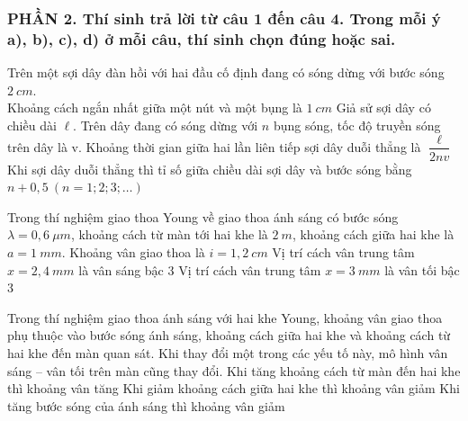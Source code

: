 \subsubsection*{PHẦN 2. Thí sinh trả lời từ câu 1 đến câu 4. Trong mỗi ý a), b), c), d) ở mỗi câu, thí sinh chọn đúng hoặc sai.}
\setcounter{ex}{0}
\begin{ex}
	Trên một sợi dây đàn hồi với hai đầu cố định đang có sóng dừng với bước sóng $2 ~cm$.\\
	{Khoảng cách ngắn nhất giữa một nút và một bụng là $1 ~cm$}
	{Giả sử sợi dây có chiều dài $\ell$. Trên dây đang có sóng dừng với $n$ bụng sóng, tốc độ truyền sóng trên dây là v. Khoảng thời gian giữa hai lần liên tiếp sợi dây duỗi thẳng là $\dfrac{\ell}{2 nv}$}
	{Khi sợi dây duỗi thẳng thì tỉ số giữa chiều dài sợi dây và bước sóng bằng $n+0,5\ (n=1; 2; 3; \ldots)$}
	
\end{ex}

\begin{ex}
	Trong thí nghiệm giao thoa Young về giao thoa ánh sáng có bước sóng $\lambda=0,6~\mu m$, khoảng cách từ màn tới hai khe là $2 ~m$, khoảng cách giữa hai khe là $a=1 ~mm$.
		{Khoảng vân giao thoa là $i=1,2~cm$}
		{Vị trí cách vân trung tâm $x=2,4~mm$ là vân sáng bậc 3}
		{\True Vị trí cách vân trung tâm $x=3~mm$ là vân tối bậc 3}
\end{ex}
\begin{ex}
Trong thí nghiệm giao thoa ánh sáng với hai khe Young, khoảng vân giao thoa phụ thuộc vào bước sóng ánh sáng, khoảng cách giữa hai khe và khoảng cách từ hai khe đến màn quan sát. Khi thay đổi một trong các yếu tố này, mô hình vân sáng – vân tối trên màn cũng thay đổi. 
	{\True Khi tăng khoảng cách từ màn đến hai khe thì khoảng vân tăng}
	{Khi giảm khoảng cách giữa hai khe thì khoảng vân giảm}
	{Khi tăng bước sóng của ánh sáng thì khoảng vân giảm}
\end{ex}

